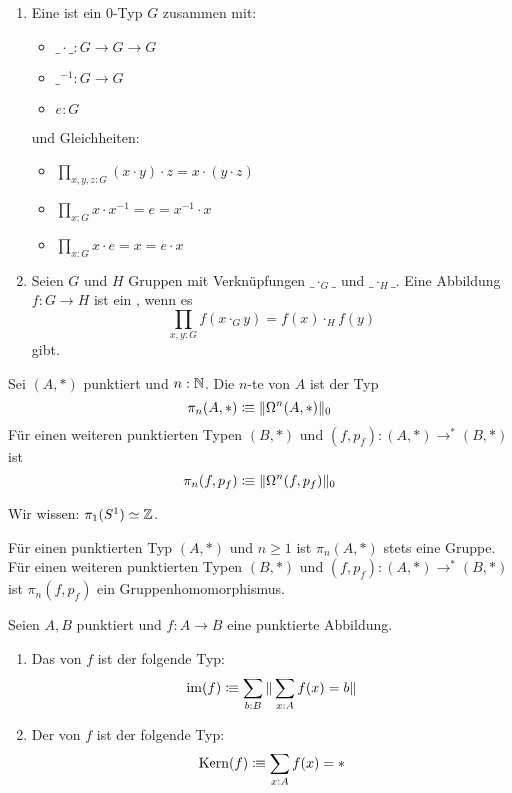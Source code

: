 \begin{definition}
  \begin{enumerate}
  \item Eine  ist ein 0-Typ $G$ zusammen mit:
    \begin{itemize}
    \item $\_\cdot\_:G\to G\to G$
    \item $\_^{-1}:G\to G$
    \item $e:G$
    \end{itemize}
    und Gleichheiten:
    \begin{itemize}
    \item $\prod_{x,y,z:G}(x\cdot y)\cdot z=x\cdot (y\cdot z)$
    \item $\prod_{x:G}x\cdot x^{-1}=e=x^{-1}\cdot x$
    \item $\prod_{x:G}x\cdot e =x=e\cdot x$
    \end{itemize}
  \item Seien $G$ und $H$ Gruppen mit Verknüpfungen $\_\cdot_G\_$ und  $\_\cdot_H\_$. Eine Abbildung $f:G\to H$ ist ein , wenn es
    \[
      \prod_{x,y:G}f(x\cdot_G y)=f(x)\cdot_H f(y)
    \]
    gibt. 
  \end{enumerate}
\end{definition}

\begin{definition}
  Sei $(A,\ast)$ punktiert und $n:\mathbb{N}$. Die $n$-te  von $A$ ist der Typ
  \[
    \pi_n(A,\ast)\vcentcolon\mspace{-1.2mu}\equiv \|\Omega^n(A,\ast)\|_0
  \]
  Für einen weiteren punktierten Typen $(B,\ast)$ und $(f,p_f):(A,\ast)\to^\ast(B,\ast)$ ist
  \[
    \pi_n(f,p_f)\vcentcolon\mspace{-1.2mu}\equiv \|\Omega^n(f,p_f)\|_0
  \]
\end{definition}

\begin{beispiel}
  Wir wissen: $\pi_1(S^1)\simeq \mathbb{Z}$.
\end{beispiel}

\begin{bemerkung}
  Für einen punktierten Typ $(A,\ast)$ und $n\geq 1$ ist $\pi_n(A,\ast)$ stets eine Gruppe.
  Für einen weiteren punktierten Typen $(B,\ast)$ und $(f,p_f):(A,\ast)\to^\ast(B,\ast)$ ist $\pi_n(f,p_f)$ ein Gruppenhomomorphismus.
\end{bemerkung}

\begin{definition}
  Seien $A,B$ punktiert und $f:A\to B$ eine punktierte Abbildung.
  \begin{enumerate}
  \item Das  von $f$ ist der folgende Typ:
    \[
      \mathrm{im}(f)\vcentcolon\mspace{-1.2mu}\equiv \sum_{b:B}\|\sum_{x:A}f(x)=b\|
    \]
  \item Der  von $f$ ist der folgende Typ:
    \[
      \mathrm{Kern}(f)\vcentcolon\mspace{-1.2mu}\equiv \sum_{x:A}f(x)=\ast
    \]
  \end{enumerate}
\end{definition}

